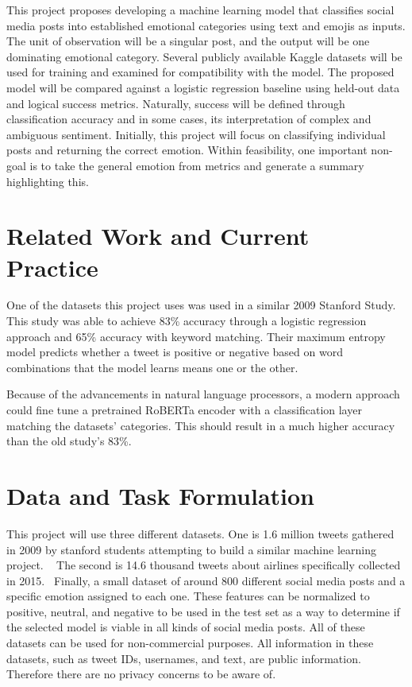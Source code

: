 \documentclass[sigconf,nonacm]{acmart}
\begin{document}
This project proposes developing a machine learning model that classifies social media posts into established emotional categories using text and emojis as inputs. The unit of observation will be a singular post, and the output will be one dominating emotional category. Several publicly available Kaggle datasets will be used for training and  examined for compatibility with the model. The proposed model will be compared against a logistic regression baseline using held-out data and logical success metrics. Naturally, success will be defined through classification accuracy and in some cases, its interpretation of complex and ambiguous sentiment. Initially, this project will focus on classifying individual posts and returning the correct emotion. Within feasibility, one important non-goal is to take the general emotion from metrics and generate a summary highlighting this.


\section{Related Work and Current Practice}
One of the datasets this project uses was used in a similar 2009 Stanford Study. ~\cite{go2009twitter}  This study was able to achieve 83\% accuracy through a logistic regression approach and 65\% accuracy with keyword matching.  Their maximum entropy model predicts whether a tweet is positive or negative based on word combinations that the model learns means one or the other.

Because of the advancements in natural language processors, a modern approach could fine tune a pretrained RoBERTa encoder with a classification layer matching the datasets' categories.  This should result in a much higher accuracy than the old study's 83\%.

\section{Data and Task Formulation}
This project will use three different datasets.  One is 1.6 million tweets gathered in 2009 by stanford students attempting to build a similar machine learning project. ~\cite{sentiment140kaggle}  The second is 14.6 thousand tweets about airlines specifically collected in 2015.~\cite{crowdflower_airline_sentiment}  Finally, a small dataset of around 800 different social media posts and a specific emotion assigned to each one.\cite{parmar_social_media_sentiments}  These features can be normalized to positive, neutral, and negative to be used in the test set as a way to determine if the selected model is viable in all kinds of social media posts.  All of these datasets can be used for non-commercial purposes.  All information in these datasets, such as tweet IDs, usernames, and text, are public information.  Therefore there are no privacy concerns to be aware of.
\end{document}
